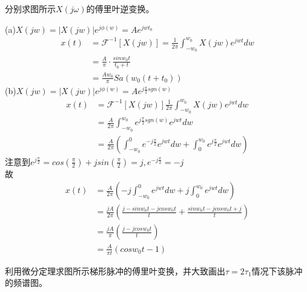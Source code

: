 \documentclass[answers]{exam}  %
\begin{document}
\begin{questions}
\newpage
\question 分别求图所示$X(j\omega)$的傅里叶逆变换。


\begin{solution}
	(a)$X(jw)=|X(jw)|e^{j\phi(w)}=Ae^{jwt_0}$\\
	\begin{align*}
		x(t)&=\mathcal{F}^{-1}[X(jw)]=\frac{1}{2\pi}\int_{-w_0}^{w_0}X(jw)e^{jwt}dw\\
		&=\frac{A}{\pi}\cdot\frac{sinw_0t}{t_0+t}\\
		&=\frac{Aw_0}{\pi}Sa(w_0(t+t_0))
	\end{align*}
	(b)$X(jw)=|X(jw)|e^{j\phi(w)}=Ae^{j\frac{\pi}{2}sgn(w)}$\\
	\begin{align*}
		x(t)&=\mathcal{F}^{-1}[X(jw)]\frac{1}{2\pi}\int_{-w_0}^{w_0}X(jw)e^{jwt}dw\\
		&=\frac{A}{2\pi}\int_{-w_0}^{w_0}e^{j\frac{\pi}{2}sgn(w)}e^{jwt}dw\\
		&=\frac{A}{2\pi}(\int_{-w_0}^0e^{-j\frac{\pi}{2}}e^{jwt}dw+\int_0^{w_0}e^{j\frac{\pi}{2}}e^{jwt}dw)
	\end{align*}
	注意到$e^{j\frac{\pi}{2}}=cos(\frac{\pi}{2})+jsin(\frac{\pi}{2})=j,e^{-j\frac{\pi}{2}}=-j$\\
	故\begin{align*}
		x(t)&=\frac{A}{2\pi}(-j\int_{-w_0}^0e^{jwt}dw+j\int_0^{w_0}e^{jwt}dw)\\
		&=\frac{jA}{2\pi}(\frac{j-sinw_0t-jcosw_0t}{t}+\frac{sinw_0t-jcosw_0t+j}{t})\\
		&=\frac{jA}{\pi}(\frac{j-jcosw_0t}{t})\\
		&=\frac{A}{\pi t}(cosw_0t-1)
	\end{align*}
\end{solution}

\newpage
\question 利用微分定理求图所示梯形脉冲的傅里叶变换，并大致画出$\tau=2\tau_1$情况下该脉冲的频谱图。


\end{questions}
\end{document}
